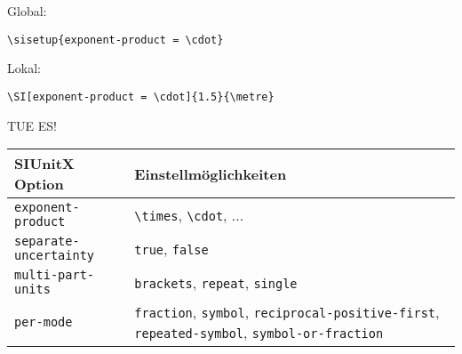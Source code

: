 \begin{frame}[fragile]
\begin{center}
\begin{tabular}{l >{\raggedright\arraybackslash}p{3cm} >{\raggedright\arraybackslash}p{1.5cm}}
			\bottomrule
		\end{tabular}
	\end{center}
	Global:\vspace{-0.1cm}
	\begin{lstlisting}
\sisetup{exponent-product = \cdot}
	\end{lstlisting}
	\vspace{-0.2cm}Lokal:\vspace{-0.1cm}
	\begin{lstlisting}
\SI[exponent-product = \cdot]{1.5}{\metre}
	\end{lstlisting}
\end{frame}
\begin{frame}[fragile]
	\begin{Aufgabe}
		TUE ES!
	\end{Aufgabe}
	\btVFill\Befehle
	\begin{center}
		\begin{tabular}{l >{\raggedright\arraybackslash}p{5cm}}
			\toprule
			SIUnitX Option						&	Einstellmöglichkeiten										\\ \midrule
			\lstinline|exponent-product|		&	\lstinline|\times|, \lstinline|\cdot|, ...					\\
			\lstinline|separate-uncertainty|	&	\lstinline|true|, \lstinline|false|							\\
			\lstinline|multi-part-units|		&	\lstinline|brackets|, \lstinline|repeat|, \lstinline|single|	\\
			\lstinline|per-mode|				&	\lstinline|fraction|, \lstinline|symbol|, \lstinline|reciprocal-positive-first|, \lstinline|repeated-symbol|, \lstinline|symbol-or-fraction|	\\
			\bottomrule
		\end{tabular}
	\end{center}
	\vspace{0.1cm}
\end{frame}